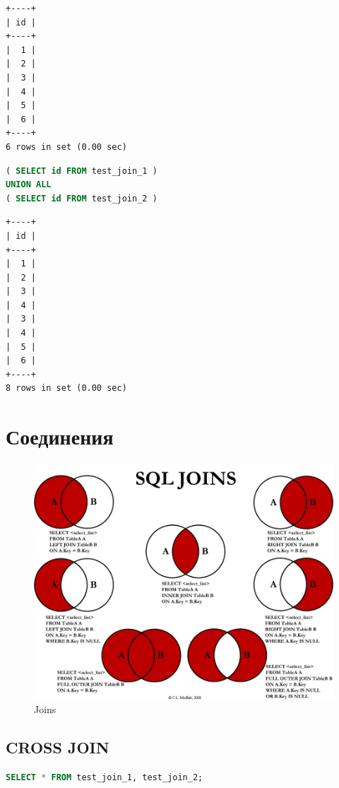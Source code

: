 \documentclass[12pt,a4paper]{article}
\begin{document}
\begin{lstlisting}[basicstyle = \tiny\ttfamily, columns = fixed]
+----+
| id |
+----+
|  1 |
|  2 |
|  3 |
|  4 |
|  5 |
|  6 |
+----+
6 rows in set (0.00 sec)
\end{lstlisting}

\begin{lstlisting}[language=SQL]
( SELECT id FROM test_join_1 )
UNION ALL
( SELECT id FROM test_join_2 )
\end{lstlisting}

\begin{lstlisting}[basicstyle = \tiny\ttfamily, columns = fixed]
+----+
| id |
+----+
|  1 |
|  2 |
|  3 |
|  4 |
|  3 |
|  4 |
|  5 |
|  6 |
+----+
8 rows in set (0.00 sec)
\end{lstlisting}

\section{Соединения}
\begin{figure}[ht]
    \includegraphics[width=\linewidth]{images/Lab5/joins.jpg}
    \caption{Joins}
    \label{fig:Joins}
\end{figure}
\subsection{CROSS JOIN}

\begin{lstlisting}[language=SQL]
SELECT * FROM test_join_1, test_join_2;
\end{lstlisting}
\end{document}

